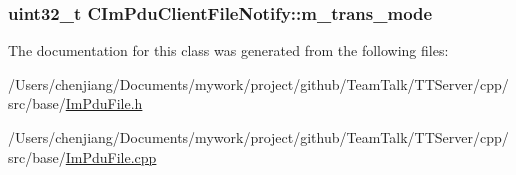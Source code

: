 \subsubsection[{m\+\_\+trans\+\_\+mode}]{\setlength{\rightskip}{0pt plus 5cm}uint32\+\_\+t C\+Im\+Pdu\+Client\+File\+Notify\+::m\+\_\+trans\+\_\+mode\hspace{0.3cm}{\ttfamily [private]}}\label{class_c_im_pdu_client_file_notify_a5db3bf3dd56e3f783b75367b42d8cc31}


The documentation for this class was generated from the following files\+:\begin{DoxyCompactItemize}
\item 
/\+Users/chenjiang/\+Documents/mywork/project/github/\+Team\+Talk/\+T\+T\+Server/cpp/src/base/\hyperlink{_im_pdu_file_8h}{Im\+Pdu\+File.\+h}\item 
/\+Users/chenjiang/\+Documents/mywork/project/github/\+Team\+Talk/\+T\+T\+Server/cpp/src/base/\hyperlink{_im_pdu_file_8cpp}{Im\+Pdu\+File.\+cpp}\end{DoxyCompactItemize}
